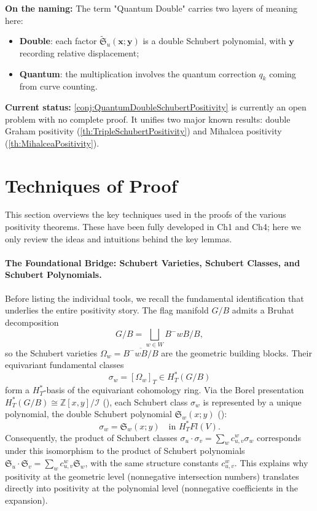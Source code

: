 \textbf{On the naming:} The term "Quantum Double" carries two layers of meaning here:
\begin{itemize}
\item \textbf{Double}: each factor $\widetilde{\mathfrak{S}}_u(\mathbf{x}; \mathbf{y})$ is a double Schubert polynomial, with $\mathbf{y}$ recording relative displacement;
\item \textbf{Quantum}: the multiplication involves the quantum correction $q_k$ coming from curve counting.
\end{itemize}

\textbf{Current status:} \cref{conj:QuantumDoubleSchubertPositivity} is currently an open problem with no complete proof. It unifies two major known results: double Graham positivity (\cref{th:TripleSchubertPositivity}) and Mihalcea positivity (\cref{th:MihalceaPositivity}).

\section{Techniques of Proof}
\label{sec:TechniquesOverview}

This section overviews the key techniques used in the proofs of the various positivity theorems. These have been fully developed in Ch1 and Ch4; here we only review the ideas and intuitions behind the key lemmas.

\paragraph*{The Foundational Bridge: Schubert Varieties, Schubert Classes, and Schubert Polynomials.}

Before listing the individual tools, we recall the fundamental identification that underlies the entire positivity story. The flag manifold $G/B$ admits a Bruhat decomposition
$$G/B = \bigsqcup_{w \in W} B^-wB/B,$$
so the Schubert varieties $\Omega_w = \overline{B^-wB/B}$ are the geometric building blocks. Their equivariant fundamental classes
$$\sigma_w = [\Omega_w]_T \in H_T^*(G/B)$$
form a $H_T^*$-basis of the equivariant cohomology ring. Via the Borel presentation $H_T^*(G/B) \cong \mathbb{Z}[x,y]/\mathcal{I}$ (\cite[Theorem 15.6.1]{AndersonFulton}), each Schubert class $\sigma_w$ is represented by a unique polynomial, the double Schubert polynomial $\mathfrak{S}_w(x;y)$ (\cite[Theorem 10.6.4]{AndersonFulton}):
$$\sigma_w = \mathfrak{S}_w(x;y) \quad \text{in } H_T^* Fl(V).$$
Consequently, the product of Schubert classes $\sigma_u \cdot \sigma_v = \sum_w c_{u,v}^w \sigma_w$ corresponds under this isomorphism to the product of Schubert polynomials $\mathfrak{S}_u \cdot \mathfrak{S}_v = \sum_w c_{u,v}^w \mathfrak{S}_w$, with the same structure constants $c_{u,v}^w$. This explains why positivity at the geometric level (nonnegative intersection numbers) translates directly into positivity at the polynomial level (nonnegative coefficients in the expansion).

